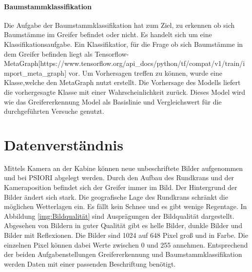 	\paragraph{Baumstammklassifikation} Die Aufgabe der Baumstammklassifikation hat zum Ziel, zu erkennen ob sich Baumstämme im Greifer befindet oder nicht. Es handelt sich um eine Klassifikationsaufgabe.
	Ein Klassifikatior, für die Frage ob sich Baumstämme in dem Greifer befinden liegt als Tensorflow-MetaGraph[https://www.tensorflow.org/api\_docs/python/tf/compat/v1/train/import\_meta\_graph] vor. Um Vorhersagen treffen zu können, wurde eine Klasse,welche den MetaGraph nutzt erstellt. Die Vorhersage des Modells liefert die vorhergesagte Klasse mit einer Wahrscheinlichkeit zurück. Dieses Model wird wie das Greifererkennung Model als Basislinie und Vergleichswert für die durchgeführten Versuche genutzt.

	\section{Datenverständnis}
	\label{sec:DataUnderstanding}
	Mittels Kamera an der Kabine können neue unbeschriftete Bilder aufgenommen und bei PSIORI abgelegt werden. Durch den Aufbau des Rundkrans und der Kameraposition befindet sich der Greifer immer im Bild. Der Hintergrund der Bilder ändert sich stark. Die geografische Lage des Rundkrans schränkt die möglichen Wetterlagen ein. Es fällt kein Schnee und es gibt wenige Regentage. In Abbildung  \ref{img:Bildqualität} sind Ausprägungen der Bildqualität dargestellt. Abgesehen von Bildern in guter Qualität gibt es helle Bilder, dunkle Bilder und Bilder mit Reflexionen. Die Bilder sind 1024 auf 648 Pixel groß und in Farbe. Die einzelnen Pixel können dabei Werte zwischen 0 und 255 annehmen. 
	Entsprechend der beiden Aufgabenstellungen Greifererkennung und Baumstammklassifikation werden Daten mit einer passenden Beschriftung benötigt.
	
